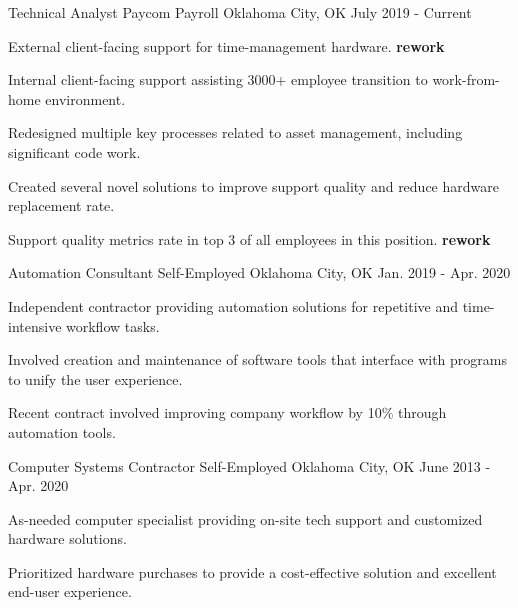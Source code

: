 

\begin{cventries}

\cventry
{Technical Analyst} %
{Paycom Payroll} %
{Oklahoma City, OK} %
{July 2019 - Current} %
{
	\begin{cvitems} %
		\item{External client-facing support for time-management hardware. \textbf{rework}}
		\item{Internal client-facing support assisting 3000+ employee transition to work-from-home environment.}
		\item{Redesigned multiple key processes related to asset management, including significant code work.}
		\item{Created several novel solutions to improve support quality and reduce hardware replacement rate.}
		\item{Support quality metrics rate in top 3 of all employees in this position. \textbf{rework}}
	\end{cvitems}
}

\cventry
{Automation Consultant} %
{Self-Employed} %
{Oklahoma City, OK} %
{Jan. 2019 - Apr. 2020} %
{
	\begin{cvitems} %
		\item{Independent contractor providing automation solutions for repetitive and time-intensive workflow tasks.}
		\item{Involved creation and maintenance of software tools that interface with programs to unify the user experience.}
		\item{Recent contract involved improving company workflow by 10\% through automation tools.}
	\end{cvitems}
}

\cventry
{Computer Systems Contractor} %
{Self-Employed} %
{Oklahoma City, OK} %
{June 2013 - Apr. 2020} %
{
	\begin{cvitems} %
		\item{As-needed computer specialist providing on-site tech support and customized hardware solutions.}
		\item{Prioritized hardware purchases to provide a cost-effective solution and excellent end-user experience.}
	\end{cvitems}
}


\end{cventries}
